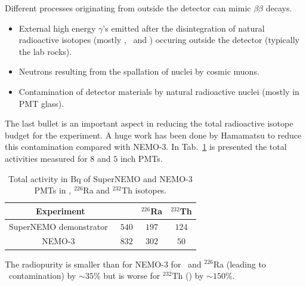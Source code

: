 Different processes originating from outside the detector can mimic $\beta\beta$ decays.
\begin{itemize}
\item External high energy $\gamma$'s emitted after the disintegration of natural radioactive isotopes (mostly \Tl, \Bi\ and \K) occuring outside the detector (typically the lab rocks).
\item Neutrons resulting from the spallation of nuclei by cosmic muons.
\item Contamination of detector materials by natural radioactive nuclei (mostly in PMT glass).
\end{itemize}
The last bullet is an important aspect in reducing the total radioactive isotope budget for the experiment.
A huge work has been done by Hamamatsu to reduce this contamination compared with NEMO-$3$.
In Tab.~\ref{tab:meas_ext_cont} is presented the total activities measured for $8$ and $5$ inch PMTs.
\begin{table}[h!]
  \centering
  \begin{tabular}{|c|c|c|c|}
    \hline
    Experiment & \K & $^{226}$Ra & $^{232}$Th \\
    \hline\hline
    SuperNEMO demonstrator~\cite{docdb:perrot2017} & $540$ & $197$ & $124$ \\
    NEMO-$3$~\cite{art:NEMO3_2005} & $832$ & $302$ & $50$ \\
    \hline
  \end{tabular}
  \caption{Total activity in Bq of SuperNEMO and NEMO-$3$ PMTs in \K, $^{226}$Ra and $^{232}$Th isotopes.
    \label{tab:meas_ext_cont}}
\end{table}
The radiopurity is smaller than for NEMO-$3$ for \K\ and $^{226}$Ra (leading to \Bi\ contamination) by $\sim35$\% but is worse for $^{232}$Th (\Tl) by $\sim150$\%.

